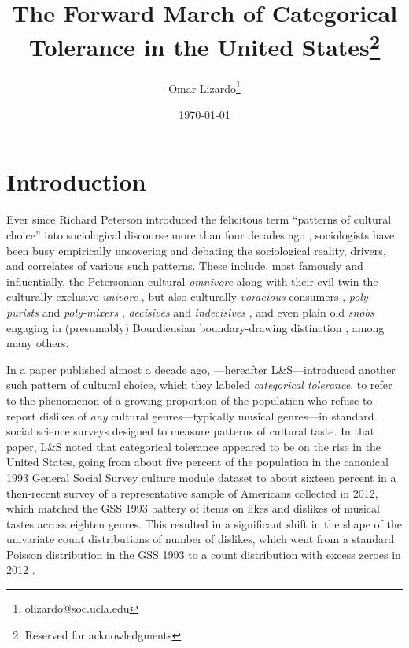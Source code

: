 \documentclass[12pt]{article}
\begin{document}
\title{The Forward March of Categorical Tolerance in the United States\thanks{Reserved for acknowledgments}}
\author[1]{Omar Lizardo\thanks{olizardo@soc.ucla.edu}}

\renewcommand\Authands{ and }

\date{\normalsize \today}	
\maketitle

\newpage
\begin{abstract}
\end{abstract}
\newpage
\section*{Introduction}
Ever since Richard Peterson introduced the felicitous term ``patterns of cultural choice'' into sociological discourse more than four decades ago \citep{peterson1983patterns-f85}, sociologists have been busy empirically uncovering and debating the sociological reality, drivers, and correlates of various such patterns. These include, most famously and influentially, the Petersonian cultural \textit{omnivore} \citep{peterson1996changing-967, goldberg2011mapping-77a, warde2008omnivorous-e77} along with their evil twin the culturally exclusive \textit{univore} \citep{bryson1997what-933, peterson1992understanding-ce3, tonkovi2025globallocal-96f}, but also culturally \textit{voracious} consumers \citep{sullivan2007omnivore-018}, \textit{poly-purists} and \textit{poly-mixers} \citep{goldberg2016what-4e3, poecke2018pure-873}, \textit{decisives} and \textit{indecisives} \citep{sonnett2004musical-961}, and even plain old \textit{snobs} engaging in (presumably) Bourdieusian boundary-drawing distinction \citep{atkinson2011context-d44, nault2021social-1bf}, among many others.

In a paper published almost a decade ago, \citet{lizardo2016end-4fb}---hereafter L\&S---introduced another such pattern of cultural choice, which they labeled \textit{categorical tolerance}, to refer to the phenomenon of a growing proportion of the population who refuse to report dislikes of \textit{any} cultural genres---typically musical genres---in standard social science surveys designed to measure patterns of cultural taste. In that paper, L\&S noted that categorical tolerance appeared to be on the rise in the United States, going from about five percent of the population in the canonical 1993 General Social Survey culture module dataset to about sixteen percent in a then-recent survey of a representative sample of Americans collected in 2012, which matched the GSS 1993 battery of items on likes and dislikes of musical tastes across eighten genres. This resulted in a significant shift in the shape of the univariate count distributions of number of dislikes, which went from a standard Poisson distribution in the GSS 1993 to a count distribution with excess zeroes in 2012 \citep[p.90, Figure 1]{lizardo2016end-4fb}. 
\end{document}

